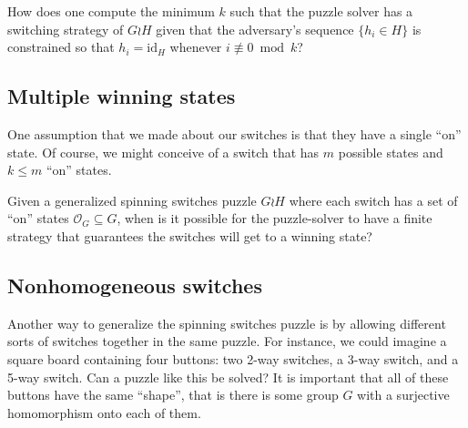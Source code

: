 \begin{openquestion}
  How does one compute the minimum $k$ such that the puzzle solver has a
  switching strategy of $G \wr H$ given that the adversary's sequence
  $\{h_i \in H\}$ is constrained so that $h_i = \mathrm{id}_H$ whenever ${i \not\equiv 0 \bmod k}$?
\end{openquestion}

\subsection{Multiple winning states}
One assumption that we made about our switches is that they have a single
``on'' state. Of course, we might conceive of a switch that has $m$ possible
states and $k \leq m$ ``on'' states.

\begin{openquestion}
  Given a generalized spinning switches puzzle $G \wr H$ where each switch has
  a set of ``on'' states $\mathcal{O}_G \subseteq G$, when is it possible for
  the puzzle-solver to have a finite strategy that guarantees the switches will
  get to a winning state?
\end{openquestion}

\subsection{Nonhomogeneous switches}

Another way to generalize the spinning switches puzzle is by allowing different
sorts of switches together in the same puzzle.
For instance, we could imagine a square board
containing four buttons: two 2-way switches, a 3-way switch, and a 5-way switch.
Can a puzzle like this be solved?
It is important that all of these buttons have the same ``shape'', that is
there is some group $G$ with a surjective homomorphism onto each of them.



